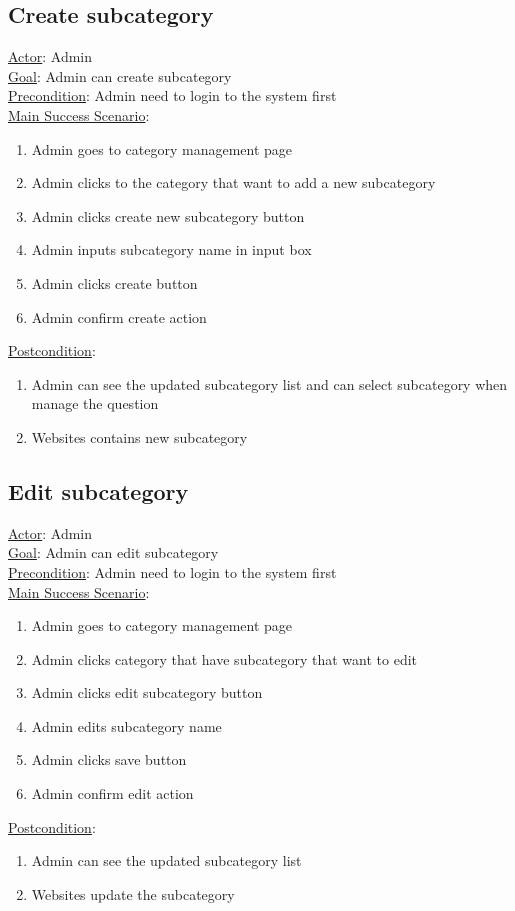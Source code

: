 \documentclass[12pt,oneside,openright,a4paper]{cpe-english-project}
\begin{document}
\subsection{Create subcategory}
\underline{Actor}: Admin\\
\underline{Goal}: Admin can create subcategory\\
\underline{Precondition}: Admin need to login to the system first\\
\underline{Main Success Scenario}:
\begin{enumerate}[label={\arabic*.}]
	\item Admin goes to category management page
	\item Admin clicks to the category that want to add a new subcategory
	\item Admin clicks create new subcategory button
	\item Admin inputs subcategory name in input box
	\item Admin clicks create button
	\item Admin confirm create action
\end{enumerate}
\underline{Postcondition}: 
\begin{enumerate}[label={\arabic*.}]
	\item Admin can see the updated subcategory list and can select subcategory when manage the question
	\item Websites contains new subcategory
\end{enumerate}

\subsection{Edit subcategory}
\underline{Actor}: Admin\\
\underline{Goal}: Admin can edit subcategory\\
\underline{Precondition}: Admin need to login to the system first\\
\underline{Main Success Scenario}:
\begin{enumerate}[label={\arabic*.}]
	\item Admin goes to category management page
	\item Admin clicks category that have subcategory that want to edit
	\item Admin clicks edit subcategory button
	\item Admin edits subcategory name
	\item Admin clicks save button
	\item Admin confirm edit action
\end{enumerate}
\underline{Postcondition}: 
\begin{enumerate}[label={\arabic*.}]
	\item Admin can see the updated subcategory list
	\item Websites update the subcategory
\end{enumerate}
\end{document}
